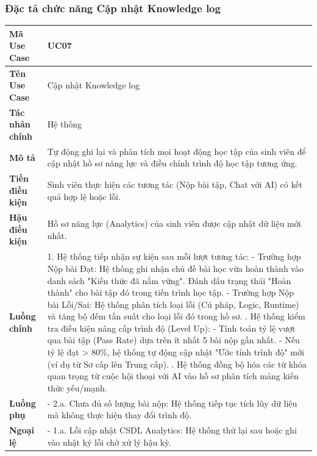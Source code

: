 \documentclass[../main.tex]{subfiles}
\begin{document}
\subsubsection{Đặc tả chức năng Cập nhật Knowledge log}


{
\renewcommand{\arraystretch}{1.5}
\begin{tabularx}{\textwidth}{|p{3.5cm}|X|}
\caption{Bảng đặc tả chức năng Cập nhật Knowledge log}
\label{tab:bang-dac-ta-chuc-nang-cap-nhat-knowledge-log}
\\
\hline
\textbf{Mã Use Case} & UC07 \\
\hline
\textbf{Tên Use Case} & Cập nhật Knowledge log \\
\hline
\textbf{Tác nhân chính} & Hệ thống \\
\hline
\textbf{Mô tả} & Tự động ghi lại và phân tích mọi hoạt động học tập của sinh viên để cập nhật hồ sơ năng lực và điều chỉnh trình độ học tập tương ứng. \\
\hline
\textbf{Tiền điều kiện} & Sinh viên thực hiện các tương tác (Nộp bài tập, Chat với AI) có kết quả hợp lệ hoặc lỗi. \\
\hline
\textbf{Hậu điều kiện} & Hồ sơ năng lực (Analytics) của sinh viên được cập nhật dữ liệu mới nhất. \\
\hline
\textbf{Luồng chính} & 1. Hệ thống tiếp nhận sự kiện sau mỗi lượt tương tác: \newline - Trường hợp Nộp bài Đạt: \newline \+ Hệ thống ghi nhận chủ đề bài học vừa hoàn thành vào danh sách "Kiến thức đã nắm vững". \newline \+ Đánh dấu trạng thái "Hoàn thành" cho bài tập đó trong tiến trình học tập. \newline - Trường hợp Nộp bài Lỗi/Sai: \newline \+ Hệ thống phân tích loại lỗi (Cú pháp, Logic, Runtime) và tăng bộ đếm tần suất cho loại lỗi đó trong hồ sơ. \newline 2. Hệ thống kiểm tra điều kiện nâng cấp trình độ (Level Up): \newline - Tính toán tỷ lệ vượt qua bài tập (Pass Rate) dựa trên ít nhất 5 bài nộp gần nhất. \newline - Nếu tỷ lệ đạt > 80\%, hệ thống tự động cập nhật "Ước tính trình độ" mới (ví dụ từ Sơ cấp lên Trung cấp). \newline 3. Hệ thống đồng bộ hóa các từ khóa quan trọng từ cuộc hội thoại với AI vào hồ sơ phân tích mảng kiến thức yếu/mạnh. \\
\hline
\textbf{Luồng phụ} & - 2.a. Chưa đủ số lượng bài nộp: Hệ thống tiếp tục tích lũy dữ liệu mà không thực hiện thay đổi trình độ. \\
\hline
\textbf{Ngoại lệ} & - 1.a. Lỗi cập nhật CSDL Analytics: Hệ thống thử lại sau hoặc ghi vào nhật ký lỗi chờ xử lý hậu kỳ. \\
\hline
\end{tabularx}
}
\end{document}
